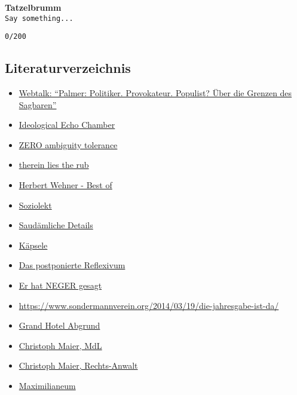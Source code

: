 \documentclass[]{article}
\providecommand{\tightlist}{%
  \setlength{\itemsep}{0pt}\setlength{\parskip}{0pt}}
\begin{document}
\textbf{Tatzelbrumm}\\
\texttt{Say\ something...}

\texttt{0/200}

\subsection{Literaturverzeichnis}\label{literaturverzeichnis}

\begin{itemize}
\tightlist
\item
  \href{https://youtu.be/SqAqg0ZIrhM}{Webtalk: ``Palmer: Politiker.
  Provokateur. Populist? Über die Grenzen des Sagbaren''}
\item
  \href{https://en.wikipedia.org/wiki/Google\%27s_Ideological_Echo_Chamber}{Ideological
  Echo Chamber}
\item
  \href{https://en.wikipedia.org/wiki/Ambiguity_tolerance\%E2\%80\%93intolerance}{ZERO
  ambiguity tolerance}
\item
  \href{https://en.wiktionary.org/wiki/therein_lies_the_rub}{therein
  lies the rub}
\item
  \href{https://youtu.be/01OgjnWvpI8}{Herbert Wehner - Best of}
\item
  \href{https://de.wikipedia.org/wiki/Soziolekt}{Soziolekt}
\item
  \href{https://www.spiegel.de/politik/saudaemliche-details-a-b4b5580e-0002-0001-0000-000045144001}{Saudämliche
  Details}
\item
  \href{http://www.schwaebisches-woerterbuch.de/default.asp?q=K\%E4psale}{Käpsele}
\item
  \href{http://www.zweitgeist.net/2010/01/das-postponierte-reflexivum/}{Das
  postponierte Reflexivum}
\item
  \href{https://youtu.be/Z67IGJz_kCI}{Er hat NEGER gesagt}
\item
  \url{https://www.sondermannverein.org/2014/03/19/die-jahresgabe-ist-da/}
\item
  \href{https://www.zeit.de/2019/48/grand-hotel-abgrund-frankfurter-schule-stuart-jeffries}{Grand
  Hotel Abgrund}
\item
  \href{https://www.bayern.landtag.de/abgeordnete/abgeordnete-von-a-z/profil/christoph-maier/}{Christoph
  Maier, MdL}
\item
  \href{https://www.ra-cm.de/christoph-maier-rechtsanwalt}{Christoph
  Maier, Rechts-Anwalt}
\item
  \href{https://www.bayern.landtag.de/maximilianeum/landtagsgebaeude/}{Maximilianeum}

\end{itemize}
\end{document}

